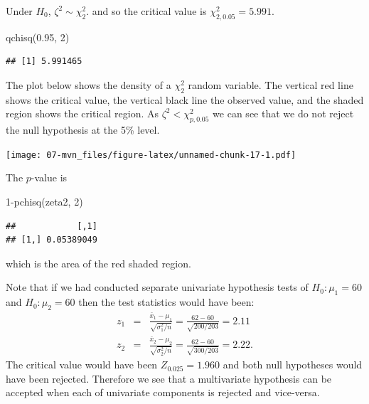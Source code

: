 \documentclass[
]{book}
\newenvironment{Shaded}{\begin{snugshade}}{\end{snugshade}}
\newcommand{\DecValTok}[1]{\textcolor[rgb]{0.00,0.00,0.81}{#1}}
\newcommand{\FloatTok}[1]{\textcolor[rgb]{0.00,0.00,0.81}{#1}}
\newcommand{\FunctionTok}[1]{\textcolor[rgb]{0.00,0.00,0.00}{#1}}
\newcommand{\NormalTok}[1]{#1}
\newcommand{\SpecialCharTok}[1]{\textcolor[rgb]{0.00,0.00,0.00}{#1}}
\theoremstyle{definition}
\theoremstyle{definition}
\theoremstyle{definition}
\theoremstyle{definition}
\theoremstyle{remark}
\begin{document}
Under \(H_0\), \(\zeta^2\sim \chi^2_2\). and so the critical value is \(\chi^2_{2,0.05} = 5.991\).

\begin{Shaded}
\begin{Highlighting}[]
\FunctionTok{qchisq}\NormalTok{(}\FloatTok{0.95}\NormalTok{, }\DecValTok{2}\NormalTok{)}
\end{Highlighting}
\end{Shaded}

\begin{verbatim}
## [1] 5.991465
\end{verbatim}

The plot below shows the density of a \(\chi^2_2\) random variable. The vertical red line shows the critical value, the vertical black line the observed value, and the shaded region shows the critical region. As \(\zeta^2 < \chi^2_{p,0.05}\) we can see that we do not reject the null hypothesis at the 5\% level.

\texttt{[image: 07-mvn\_files/figure-latex/unnamed-chunk-17-1.pdf]}

The \(p\)-value is

\begin{Shaded}
\begin{Highlighting}[]
\DecValTok{1}\SpecialCharTok{{-}}\FunctionTok{pchisq}\NormalTok{(zeta2, }\DecValTok{2}\NormalTok{)}
\end{Highlighting}
\end{Shaded}

\begin{verbatim}
##            [,1]
## [1,] 0.05389049
\end{verbatim}

which is the area of the red shaded region.

Note that if we had conducted separate univariate hypothesis tests of \(H_0: \mu_1 = 60\) and \(H_0: \mu_2 = 60\) then the test statistics would have been:
\begin{eqnarray*}
z_1 &=& \frac{\bar{x}_1 - \mu_1}{\sqrt{\sigma_1^2/n}} = \frac{62-60}{\sqrt{200/203}} = 2.11  \\
z_2 &=& \frac{\bar{x}_2 - \mu_2}{\sqrt{\sigma_2^2/n}} = \frac{62-60}{\sqrt{300/203}} = 2.22.
\end{eqnarray*}
The critical value would have been \(Z_{0.025} = 1.960\) and both null hypotheses would have been rejected. Therefore we see that a multivariate hypothesis can be accepted when each of univariate components is rejected and vice-versa.
\end{document}
